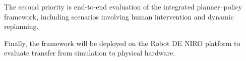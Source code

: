 \documentclass[conference, 12pt]{IEEEtran}
\begin{document}
The second priority is end-to-end evaluation of the integrated planner--policy framework, including scenarios involving human intervention and dynamic replanning.

Finally, the framework will be deployed on the Robot DE NIRO platform to evaluate transfer from simulation to physical hardware.







\end{document}
